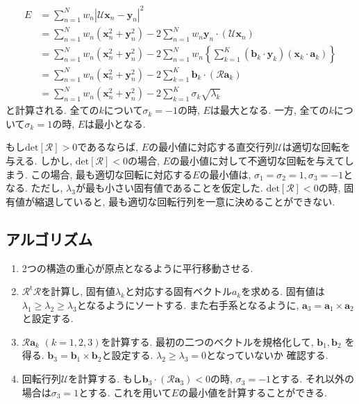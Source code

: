 \begin{align}
   E
&=
   \sum_{n=1}^{N} w_{n} |\mathcal{U}\mathbf{x}_{n} - \mathbf{y}_{n}|^{2}
   \\
&=
    \sum_{n=1}^{N} w_{n} \left(\mathbf{x}_{n}^{2} + \mathbf{y}_{n}^{2} \right)
  -2\sum_{n=1}^{N} w_{n} \mathbf{y}_{n} \cdot (\mathcal{U}\mathbf{x}_{n})
   \\
&=
    \sum_{n=1}^{N} w_{n} \left(\mathbf{x}_{n}^{2} + \mathbf{y}_{n}^{2}\right)
  -2\sum_{n=1}^{N} w_{n} \left\{ \sum_{k=1}^{K} (\mathbf{b}_{k} \cdot \mathbf{y}_{k}) 
                                                (\mathbf{x}_{k} \cdot \mathbf{a}_{k}) \right\}
   \\
&=
    \sum_{n=1}^{N} w_{n} \left(\mathbf{x}_{n}^{2} + \mathbf{y}_{n}^{2}\right)
  -2\sum_{k=1}^{K} \mathbf{b}_{k} \cdot (\mathcal{R}\mathbf{a}_{k})
   \\
&=
     \sum_{n=1}^{N} w_{n} \left(\mathbf{x}_{n}^{2} + \mathbf{y}_{n}^{2}\right)
   -2\sum_{k=1}^{K} \sigma_{k} \sqrt{\lambda_{k}}
\end{align}
と計算される. 全ての$k$について$\sigma_{k}=-1$の時, $E$は最大となる.
一方, 全ての$k$について$\sigma_{k}=1$の時, $E$は最小となる.

もし$\mathrm{det} [\mathcal{R}] > 0$であるならば, $E$の最小値に対応する直交行列$\mathcal{U}$は適切な回転を与える.
しかし, $\mathrm{det} [\mathcal{R}] < 0$の場合, $E$の最小値に対して不適切な回転を与えてしまう.
この場合, 最も適切な回転に対応する$E$の最小値は, $\sigma_{1} = \sigma_{2} = 1, \sigma_{3} = -1$となる.
ただし, $\lambda_{3}$が最も小さい固有値であることを仮定した.
$\mathrm{det} [\mathcal{R}] < 0$の時, 固有値が縮退していると, 最も適切な回転行列を一意に決めることができない.

\subsection{アルゴリズム}
\begin{enumerate}
 \item 
       2つの構造の重心が原点となるように平行移動させる.
 \item 
       $\mathcal{R}^{\mathrm{t}}\mathcal{R}$を計算し, 固有値$\lambda_{k}$と対応する固有ベクトル$a_{k}$を求める.
       固有値は$\lambda_{1} \ge \lambda_{2} \ge \lambda_{3}$となるようにソートする.
       また右手系となるように, $\mathbf{a}_{3} = \mathbf{a}_{1} \times \mathbf{a}_{2}$と設定する.
 \item 
       $\mathcal{R}\mathbf{a}_{k}$ $(k = 1,2,3)$を計算する. 最初の二つのベクトルを規格化して, $\mathbf{b}_{1}, \mathbf{b}_{2}$
       を得る. $\mathbf{b}_{3} = \mathbf{b}_{1} \times \mathbf{b}_{2}$と設定する. $\lambda_{2} \ge \lambda_{3} =0$となっていないか
       確認する.
 \item 
       回転行列$\mathcal{U}$を計算する.
       もし$\mathbf{b}_{3} \cdot (\mathcal{R}\mathbf{a}_{3}) < 0$の時, $\sigma_{3} = -1$とする.
       それ以外の場合は$\sigma_{3} = 1$とする.
       これを用いて$E$の最小値を計算することができる.
\end{enumerate}

